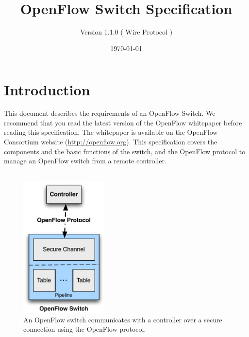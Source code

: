 \documentclass[10pt]{article}
\begin{document}

\newcommand{\ofversion}{1.1.0}

%
\newlength{\atactionwidth}
\newlength{\atassocwidth}
\newlength{\atdescwidth}
\setlength{\atactionwidth}{0.25\textwidth - 2 \tabcolsep}
\setlength{\atassocwidth}{0.30\textwidth - 2 \tabcolsep}
\setlength{\atdescwidth}{0.45\textwidth - 2 \tabcolsep}

\pagestyle{fancy}
\fancyhead{}
\rhead{Version \ofversion}
\renewcommand{\headrulewidth}{0.4pt}
\renewcommand{\footrulewidth}{0.4pt}

\selectfont

\title{OpenFlow Switch Specification}
\author{Version \ofversion{} ( Wire Protocol )}
\date{\today}
\maketitle

\tableofcontents
\listoftables
\listoffigures
\clearpage

\section{Introduction}
This document describes the requirements of an OpenFlow Switch.  We recommend that you read the latest version of the OpenFlow whitepaper before reading this specification. The whitepaper is available on the  OpenFlow Consortium website (\url{http://openflow.org}). This specification covers the components and the basic functions of the switch, and the OpenFlow protocol to manage an OpenFlow switch from a remote controller.
\\\\

\begin{figure}[htbp]
\centering
\includegraphics[height=2.8in]{switch_overview}
\caption{An OpenFlow switch communicates with a controller over a secure connection using the OpenFlow protocol.}
\label{fig:flow table and controller}
\end{figure}
\end{document}
